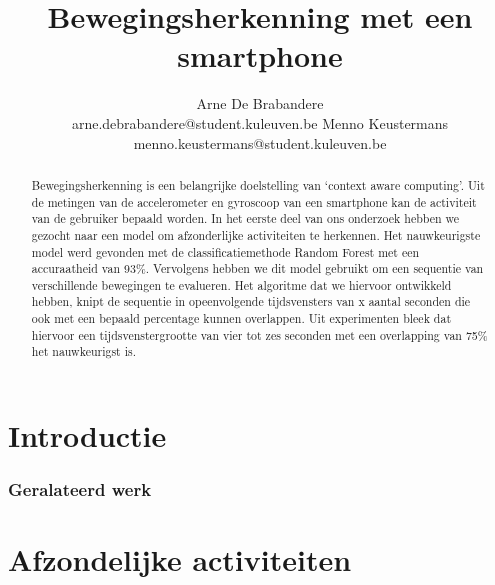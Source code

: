 \documentclass{article}
\title{Bewegingsherkenning met een smartphone}
\author{Arne De Brabandere\\
	arne.debrabandere@student.kuleuven.be
    \And
    Menno Keustermans\\
    menno.keustermans@student.kuleuven.be}
\begin{document}
\maketitle

\begin{abstract}

Bewegingsherkenning is een belangrijke doelstelling van `context aware computing'. Uit de metingen van de accelerometer en gyroscoop van een smartphone kan de activiteit van de gebruiker bepaald worden. In het eerste deel van ons onderzoek hebben we gezocht naar een model om afzonderlijke activiteiten te herkennen. Het nauwkeurigste model werd gevonden met de classificatiemethode Random Forest met een accuraatheid van 93\%. Vervolgens hebben we dit model gebruikt om een sequentie van verschillende bewegingen te evalueren. Het algoritme dat we hiervoor ontwikkeld hebben, knipt de sequentie in opeenvolgende tijdsvensters van x aantal seconden die ook met een bepaald percentage kunnen overlappen. Uit experimenten bleek dat hiervoor een tijdsvenstergrootte van vier tot zes seconden met een overlapping van 75\% het nauwkeurigst is.

\end{abstract}

\section{Introductie}


\subsubsection{Geralateerd werk}




\section{Afzondelijke activiteiten}
\label{afzonderlijk}
\end{document}

